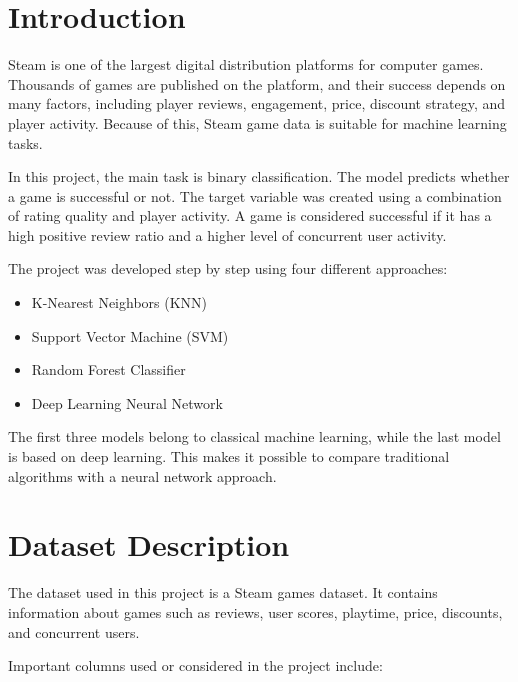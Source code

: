 \documentclass[12pt,a4paper]{article}
\begin{document}
\section{Introduction}

Steam is one of the largest digital distribution platforms for computer games. Thousands of games are published on the platform, and their success depends on many factors, including player reviews, engagement, price, discount strategy, and player activity. Because of this, Steam game data is suitable for machine learning tasks.

In this project, the main task is binary classification. The model predicts whether a game is successful or not. The target variable was created using a combination of rating quality and player activity. A game is considered successful if it has a high positive review ratio and a higher level of concurrent user activity.

The project was developed step by step using four different approaches:

\begin{itemize}
    \item K-Nearest Neighbors (KNN)
    \item Support Vector Machine (SVM)
    \item Random Forest Classifier
    \item Deep Learning Neural Network
\end{itemize}

The first three models belong to classical machine learning, while the last model is based on deep learning. This makes it possible to compare traditional algorithms with a neural network approach.

\section{Dataset Description}

The dataset used in this project is a Steam games dataset. It contains information about games such as reviews, user scores, playtime, price, discounts, and concurrent users.

Important columns used or considered in the project include:
\end{document}
